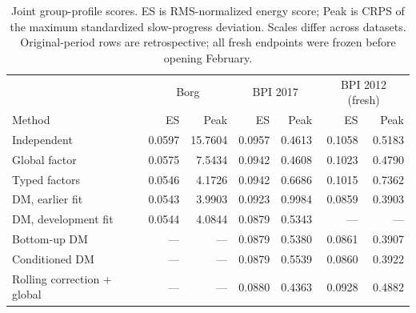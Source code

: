 \begin{table}[t]\centering\small
\caption{Joint group-profile scores. ES is RMS-normalized energy score; Peak is CRPS of the maximum standardized slow-progress deviation. Scales differ across datasets. Original-period rows are retrospective; all fresh endpoints were frozen before opening February.}\label{tab:joint}
\begin{tabular}{lrr rr rr}\toprule
&\multicolumn{2}{c}{Borg}&\multicolumn{2}{c}{BPI 2017}&\multicolumn{2}{c}{BPI 2012 (fresh)}\\
Method&ES&Peak&ES&Peak&ES&Peak\\\midrule
Independent&0.0597&15.7604&0.0957&0.4613&0.1058&0.5183\\
Global factor&0.0575&7.5434&0.0942&0.4608&0.1023&0.4790\\
Typed factors&0.0546&4.1726&0.0942&0.6686&0.1015&0.7362\\
DM, earlier fit&0.0543&3.9903&0.0923&0.9984&0.0859&0.3903\\
DM, development fit&0.0544&4.0844&0.0879&0.5343&---&---\\
Bottom-up DM&---&---&0.0879&0.5380&0.0861&0.3907\\
Conditioned DM&---&---&0.0879&0.5539&0.0860&0.3922\\
Rolling correction + global&---&---&0.0880&0.4363&0.0928&0.4882\\
\bottomrule\end{tabular}\end{table}
